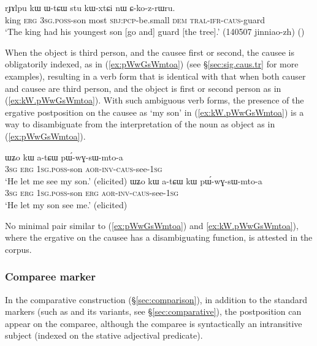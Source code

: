 \begin{exe}
\ex \label{ex:CkozRAru}
 \gll rɟɤlpu kɯ ɯ-tɕɯ stu kɯ-xtɕi nɯ ɕ-ko-z-rɯru. \\
 king \textsc{erg} \textsc{3sg}.\textsc{poss}-son most \textsc{sbj}:\textsc{pcp}-be.small \textsc{dem} \textsc{tral}-\textsc{ifr}-\textsc{caus}-guard \\
 \glt  `The king had his youngest son [go and] guard [the tree].' (140507 jinniao-zh)
()
\end{exe}

When the object is third person, and the causee first or second, the causee is obligatorily indexed, as in (\ref{ex:pWwGsWmtoa}) (see §\ref{sec:sig.caus.tr} for more examples), resulting in a verb form that is identical with that when both causer and causee are third person, and the object is first or second person as in (\ref{ex:kW.pWwGsWmtoa}). With such ambiguous verb forms, the presence of the ergative postposition on the causee as  `my son' in (\ref{ex:kW.pWwGsWmtoa}) is a way to disambiguate from the interpretation of the noun as object as in (\ref{ex:pWwGsWmtoa}). 

\begin{exe}
\ex
\begin{xlist}
\ex \label{ex:pWwGsWmtoa}
 \gll ɯʑo kɯ a-tɕɯ pɯ́-wɣ-sɯ-mto-a \\
\textsc{3sg} \textsc{erg} \textsc{1sg}.\textsc{poss}-son  \textsc{aor}-\textsc{inv}-\textsc{caus}-see-\textsc{1sg} \\
\glt `He let me see my son.' (elicited)
\ex \label{ex:kW.pWwGsWmtoa}
 \gll ɯʑo kɯ a-tɕɯ kɯ pɯ́-wɣ-sɯ-mto-a \\
\textsc{3sg} \textsc{erg} \textsc{1sg}.\textsc{poss}-son \textsc{erg} \textsc{aor}-\textsc{inv}-\textsc{caus}-see-\textsc{1sg} \\
\glt `He let my son see me.' (elicited)
\end{xlist}
\end{exe}

No minimal pair similar to (\ref{ex:pWwGsWmtoa}) and \ref{ex:kW.pWwGsWmtoa}), where the ergative on the causee has a disambiguating function, is attested in the corpus.


\subsubsection{Comparee marker} \label{sec:comparee.kW}
In the comparative construction (§\ref{sec:comparison}), in addition to the standard markers (such as  and its variants, see §\ref{sec:comparative}), the postposition  can appear on the comparee, although the comparee is syntactically an intransitive subject  (indexed on the stative adjectival predicate). 

